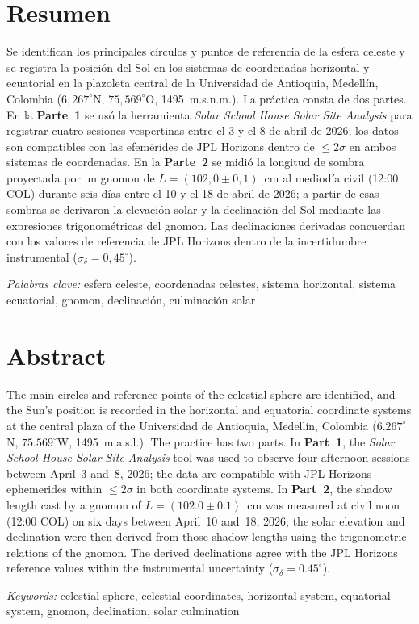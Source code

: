\markright{\mititulo \hspace{5cm} \thepage}
\pagestyle{fancy}

\section*{Resumen}

\noindent Se identifican los principales círculos y puntos de referencia de la esfera
celeste y se registra la posición del Sol en los sistemas de coordenadas horizontal y
ecuatorial en la plazoleta central de la Universidad de Antioquia, Medellín, Colombia
($6{,}267^\circ$N, $75{,}569^\circ$O, 1495~m.s.n.m.).
La práctica consta de dos partes.
En la \textbf{Parte~1} se usó la herramienta \textit{Solar School House Solar Site
Analysis} \citep{SolarSchoolHouse2026} para registrar cuatro sesiones vespertinas entre
el 3 y el 8 de abril de 2026; los datos son compatibles con las efemérides de JPL
Horizons \citep{Giorgini1996} dentro de $\leq 2\sigma$ en ambos sistemas de coordenadas.
En la \textbf{Parte~2} se midió la longitud de sombra proyectada por un gnomon de
$L = (102{,}0 \pm 0{,}1)$~cm al mediodía civil (12:00 COL) durante seis días entre el
10 y el 18 de abril de 2026; a partir de esas sombras se derivaron la elevación solar y
la declinación del Sol mediante las expresiones trigonométricas del gnomon.
Las declinaciones derivadas concuerdan con los valores de referencia de JPL
Horizons \citep{Giorgini1996} dentro de la incertidumbre instrumental
($\sigma_\delta = 0{,}45^\circ$).

\vspace{1cm}\textit{Palabras clave:} esfera celeste, coordenadas celestes, sistema horizontal, sistema ecuatorial, gnomon, declinación, culminación solar

\newpage

\section*{Abstract}

\noindent The main circles and reference points of the celestial sphere are identified,
and the Sun's position is recorded in the horizontal and equatorial coordinate systems
at the central plaza of the Universidad de Antioquia, Medellín, Colombia
($6.267^\circ$N, $75.569^\circ$W, 1495~m.a.s.l.).
The practice has two parts.
In \textbf{Part~1}, the \textit{Solar School House Solar Site Analysis} tool
\citep{SolarSchoolHouse2026} was used to observe four afternoon sessions between April~3
and~8, 2026; the data are compatible with JPL Horizons ephemerides \citep{Giorgini1996}
within $\leq 2\sigma$ in both coordinate systems.
In \textbf{Part~2}, the shadow length cast by a gnomon of
$L = (102.0 \pm 0.1)$~cm was measured at civil noon (12:00 COL) on six days between
April~10 and~18, 2026; the solar elevation and declination were then derived from those
shadow lengths using the trigonometric relations of the gnomon.
The derived declinations agree with the JPL Horizons reference values
\citep{Giorgini1996} within the instrumental uncertainty ($\sigma_\delta = 0.45^\circ$).

\vspace{1cm}\textit{Keywords:} celestial sphere, celestial coordinates, horizontal system, equatorial system, gnomon, declination, solar culmination

\newpage
